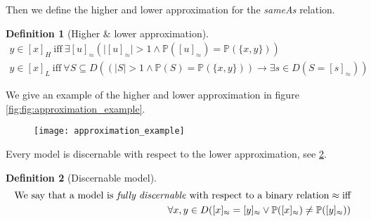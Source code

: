 \documentclass[11pt,a4paper,notitlepage,onecolumn,twoside]{article}
\newtheorem{definition}{Definition}
\begin{document}
Then we define the higher and lower approximation for the \emph{sameAs} relation.

\begin{definition}[Higher \& lower approximation]
\label{def:higher_lower_approximation}
\begin{align}
y \in [x]_H \  \text{iff} \  \exists [u]_{\approx} (
    \vert [u]_{\approx} \vert > 1
  \land
    \mathbb{P}([u]_{\approx}) = \mathbb{P}(\{ x, y \})
  ) \\
y \in [x]_L \  \text{iff} \  \forall S \subseteq D (
    (\vert S \vert > 1 \land \mathbb{P}(S) = \mathbb{P}(\{ x, y \}))
  \rightarrow
    \exists s \in D (S = [s]_{\approx})
  )
\end{align}
\end{definition}

\begin{comment}
\begin{definition}[Higher \& lower approximation]
\label{def:higher_lower_approximation}
\begin{align}
\overline{sameAs}(x,y) \  \iff \  \exists u,v (
    \mathbb{P}(u,v) = \mathbb{P}(x,y) \land sameAs(u,v)
  ) \\
\underline{sameAs}(x,y) \  \iff \  \forall u,v (
    \mathbb{P}(u,v) = \mathbb{P}(x,y) \rightarrow sameAs(u,v)
  )
\end{align}
\end{definition}
\end{comment}

We give an example of the higher and lower approximation in figure \ref{fig:fig:approximation_example}.

\begin{figure}
\label{fig:approximation_example}
\texttt{[image: approximation\_example]}
\end{figure}

Every model is discernable with respect to the lower approximation, see \ref{def:fully_discernable}.

\begin{definition}[Discernable model]
\label{def:fully_discernable}
\begin{align}
\text{We say that a model is \emph{fully discernable} with respect to a binary relation} \approx \text{iff} \\
\forall x, y \in D (
    [x]_{\approx} = [y]_{\approx}
  \lor
    \mathbb{P}([x]_{\approx}) \neq \mathbb{P}([y]_{\approx})
  )
\end{align}
\end{definition}
\end{document}
